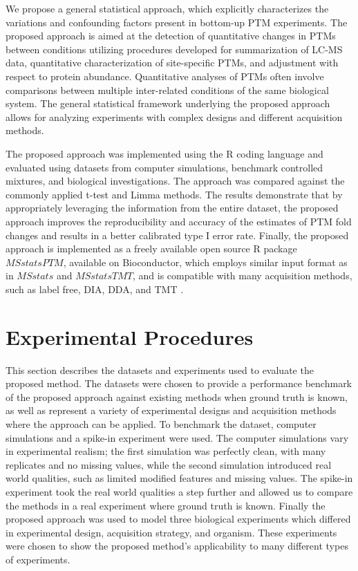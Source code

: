 \documentclass[mcp]{article}
\numberwithin{figure}{section} %
\numberwithin{table}{section}
\begin{document}
We propose a general statistical approach, which explicitly characterizes the variations and confounding factors present in bottom-up PTM experiments. The proposed approach is aimed at the detection of quantitative changes in PTMs between conditions utilizing procedures developed for summarization of LC-MS data, quantitative characterization of site-specific PTMs, and adjustment with respect to protein abundance. Quantitative analyses of PTMs often involve comparisons between multiple inter-related conditions of the same biological system. The general statistical framework underlying the proposed approach allows for analyzing experiments with complex designs and different acquisition methods. 

The proposed approach was implemented using the R coding language and evaluated using datasets from computer simulations, benchmark controlled mixtures, and biological investigations. The approach was compared against the commonly applied t-test and Limma methods\cite{Ritchie_15a}. The results demonstrate that by appropriately leveraging the information from the entire dataset, the proposed approach improves the reproducibility and accuracy of the estimates of PTM fold changes and results in a better calibrated type I error rate. Finally, the proposed approach is implemented as a freely available open source R package $MSstatsPTM$, available on Bioconductor, which employs similar input format as in $MSstats$ and $MSstatsTMT$, and is compatible with many acquisition methods, such as label free, DIA, DDA, and TMT\cite{Choi:2014} \cite{Huang:2020}.

\section{Experimental Procedures}

This section describes the datasets and experiments used to evaluate the proposed method. The datasets were chosen to provide a performance benchmark of the proposed approach against existing methods when ground truth is known, as well as represent a variety of experimental designs and acquisition methods where the approach can be applied. To benchmark the dataset, computer simulations and a spike-in experiment were used. The computer simulations vary in experimental realism; the first simulation was perfectly clean, with many replicates and no missing values, while the second simulation introduced real world qualities, such as limited modified features and missing values. The spike-in experiment took the real world qualities a step further and allowed us to compare the methods in a real experiment where ground truth is known. Finally the proposed approach was used to model three biological experiments which differed in experimental design, acquisition strategy, and organism. These experiments were chosen to show the proposed method's applicability to many different types of experiments. 
\end{document}
